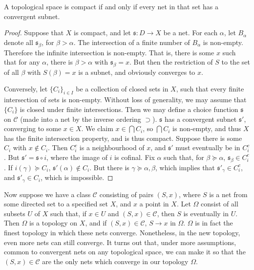 \begin{theorem}
    A topological space is compact if and only if every net in that set has a convergent subnet.
\end{theorem}
\begin{proof}
    Suppose that $X$ is compact, and let $\mathfrak{s}: D \to X$ be a net. For each $\alpha$, let $B_\alpha$ denote all $\mathfrak{s}_\beta$, for $\beta > \alpha$. The intersection of a finite number of $B_\alpha$ is non-empty. Therefore the infinite intersection is non-empty. That is, there is some $x$ such that for any $\alpha$, there is $\beta > \alpha$ with $\mathfrak{s}_\beta = x$. But then the restriction of $S$ to the set of all $\beta$ with $S(\beta) = x$ is a subnet, and obviously converges to $x$.

    Conversely, let $\{ C_i \}_{i \in I}$ be a collection of closed sets in $X$, such that every finite intersection of sets is non-empty. Without loss of generality, we may assume that $\{ C_i \}$ is closed under finite intersections. Then we may define a choice function $\mathfrak{s}$ on $\mathcal{C}$ (made into a net by the inverse ordering $\supset$). $\mathfrak{s}$ has a convergent subnet $\mathfrak{s}'$, converging to some $x \in X$. We claim $x \in \bigcap C_i$, so $\bigcap C_i$ is non-empty, and thus $X$ has the finite intersection property, and is thus compact. Suppose there is some $C_i$ with $x \not \in C_i$. Then $C_i^c$ is a neighbourhood of $x$, and $\mathfrak{s}'$ must eventually be in $C_i^c$. But $\mathfrak{s}' = \mathfrak{s} \circ i$, where the image of $i$ is cofinal. Fix $\alpha$ such that, for $\beta \succeq \alpha$, $\mathfrak{s}_\beta \in C_i^c$. If $i(\gamma) \succeq C_i$, $\mathfrak{s}'(\alpha) \not \in C_i$. But there is $\gamma \succeq \alpha, \beta$, which implies that $\mathfrak{s}'_\gamma \in C_i^c$, and $\mathfrak{s}'_\gamma \in C_i$, which is impossible.
\end{proof}

Now suppose we have a class $\mathcal{C}$ consisting of pairs $(S,x)$, where $S$ is a net from some directed set to a specified set $X$, and $x$ a point in $X$. Let $\Omega$ consist of all subsets $U$ of $X$ such that, if $x \in U$ and $(S,x) \in \mathcal{C}$, then $S$ is eventually in $U$. Then $\Omega$ is a topology on $X$, and if $(S,x) \in \mathcal{C}$, $S \to x$ in $\Omega$. $\Omega$ is in fact the finest topology in which these nets converge. Nonetheless, in the new topology, even more nets can still converge. It turns out that, under more assumptions, common to convergent nets on any topological space, we can make it so that the $(S,x) \in \mathcal{C}$ are the only nets which converge in our topology $\Omega$.

